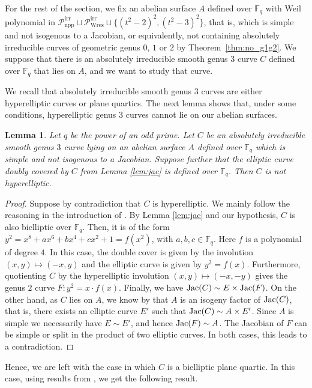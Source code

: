 \documentclass[11pt]{amsart}
\newcommand\Fq{\mathbb{F}_q}
\def\Jac{\mathop{\rm Jac}\nolimits}
\def\Jac{\mathop{\rm Jac}\nolimits}
\theoremstyle{plain}
\newtheorem{lemma}[theorem]{Lemma}
\theoremstyle{definition}
\newcommand\PirrA{\mathcal{P}^\mathrm{irr}_\mathrm{npp}}
\newcommand\PirrB{\mathcal{P}^\mathrm{irr}_\mathrm{Wres}}
\begin{document}
For the rest of the section, we fix an abelian surface $A$ defined over $\Fq$ with Weil polynomial in $\PirrA\sqcup\PirrB\sqcup \{ (t^2-2)^2 , (t^2-3)^2 \}$, that is, which is simple and not isogenous to a Jacobian, or equivalently, not containing absolutely irreducible curves of geometric genus $0$, $1$ or $2$ by Theorem~\ref{thm:no_g1g2}. We suppose that there is an absolutely irreducible smooth genus $3$ curve $C$ defined over $\Fq$ that lies on $A$, and we want to study that curve.

We recall that absolutely irreducible smooth genus $3$ curves are either hyperelliptic curves or plane quartics.  The next lemma shows that, under some conditions, hyperelliptic genus $3$ curves cannot lie on our abelian surfaces.

\begin{lemma}\label{lem:nohyper}
    Let $q$ be the power of an odd prime. Let $C$ be an absolutely irreducible smooth genus $3$ curve lying on an abelian surface $A$ defined over $\Fq$ which is simple and not isogenous to a Jacobian. Suppose further that the elliptic curve doubly covered by $C$ from Lemma \ref{lem:jac} is defined over $\Fq$. Then $C$ is not hyperelliptic.
\end{lemma}
\begin{proof}
    Suppose by contradiction that $C$ is hyperelliptic. We mainly follow the reasoning in the introduction of \cite{RR18}. By Lemma \ref{lem:jac} and our hypothesis, $C$ is also bielliptic over $\Fq$. Then, it is of the form $y^2=x^8+ax^6+bx^4+cx^2+1=f(x^2)$, with $a,b,c\in \Fq$. Here $f$ is a polynomial of degree $4$. In this case, the double cover is given by the involution $(x,y)\mapsto (-x,y)$ and the elliptic curve is given by $y^2=f(x)$. Furthermore, quotienting $C$ by the hyperelliptic involution $(x,y)\mapsto (-x,-y)$ gives the genus $2$ curve $F\colon y^2=x \cdot f(x)$. Finally, we have $\Jac(C)\sim E \times \Jac(F)$. On the other hand, as $C$ lies on $A$, we know by \cite[Prop.~2]{Haloui17} that $A$ is an isogeny factor of $\Jac(C)$, that is, there exists an elliptic curve $E'$ such that $\Jac(C)\sim A \times E'$. Since $A$ is simple we necessarily have $E\sim E'$, and hence $\Jac(F)\sim A$. The Jacobian of $F$ can be simple or split in the product of two elliptic curves. In both cases, this leads to a contradiction.
\end{proof}

Hence, we are left with the case in which $C$ is a bielliptic plane quartic. In this case, using results from \cite{RR18}, we  get the following result. 
\end{document}
